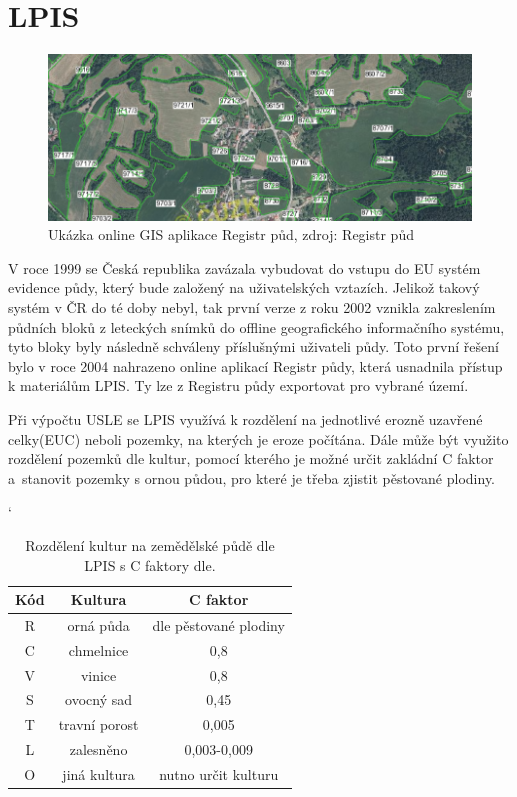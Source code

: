 \section{LPIS}
\begin{figure}[H]
    \centering \includegraphics[scale=0.7]{./pictures/lpis.png}
      \caption[Ukázka GIS online aplikace Registr půd]{Ukázka online
        GIS aplikace Registr půd, zdroj: Registr půd\cite{lpis}}
      \label{fig:lpis}
\end{figure}
V roce 1999 se Česká republika zavázala vybudovat do vstupu do EU
systém evidence půdy, který bude založený na uživatelských
vztazích. Jelikož takový systém v ČR do té doby nebyl, tak první verze
z roku 2002 vznikla zakreslením půdních bloků z leteckých snímků do
offline geografického informačního systému, tyto bloky byly následně
schváleny příslušnými uživateli půdy. Toto první řešení bylo v roce
2004 nahrazeno online aplikací Registr půdy\cite{lpis}, která
usnadnila přístup k materiálům LPIS. Ty lze z Registru půdy exportovat
pro vybrané území.\cite{lpis}

Při výpočtu USLE se LPIS využívá k rozdělení na jednotlivé erozně
uzavřené celky(EUC) neboli pozemky, na kterých je eroze počítána. Dále
může být využito rozdělení pozemků dle kultur, pomocí kterého je možné
určit zakládní C faktor a~stanovit pozemky s ornou půdou, pro které je
třeba zjistit pěstované plodiny.\cite{Novotny2014}
\begin{table}[!h]
\begin{center}
\catcode`
    \noindent\begin{tabular}{|*{3}{c|}} \hline \bf Kód & \bf Kultura &
    \bf C faktor\\ \hline R & orná půda & dle pěstované
    plodiny\\ \hline C & chmelnice & 0,8\\ \hline V & vinice &
    0,8\\ \hline S & ovocný sad & 0,45\\ \hline T & travní porost &
    0,005\\ \hline L & zalesněno & 0,003-0,009\\ \hline O & jiná
    kultura & nutno určit kulturu\\ \hline
    \end{tabular}\\
  \caption[Rozdělení kultur na zemědělské půdě dle LPIS]{Rozdělení
    kultur na zemědělské půdě dle LPIS\cite{lpis} s C faktory
    dle\cite{janecek2012}.}
  \label{tabulka_c_typ}
\end{center}
\end{table}
\FloatBarrier
